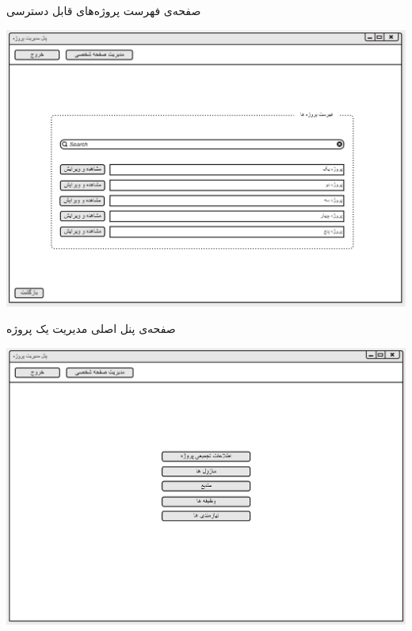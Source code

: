 \documentclass{article}
\begin{document}
\vspace{1cm}
صفحه‌ی فهرست پروژه‌های قابل دسترسی
\begin{center}
\includegraphics[width=\textwidth]{Prototype/ProjectManager/ProjectsList.png}
\end{center}

\newpage
\vspace{1cm}
صفحه‌ی پنل اصلی مدیریت یک پروژه
\begin{center}
\includegraphics[width=\textwidth]{Prototype/ProjectManager/ProjectManagementMainPanel.png}
\end{center}
\end{document}
